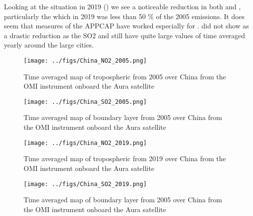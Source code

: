 Looking at the situation in 2019 () 
we see a noticeable reduction in both  and , particularly the  which 
in 2019 was less than 50 \% of the 2005 emissions. It does seem that measures of the APPCAP 
have worked especially for .  did not show as a drastic reduction as the \ch
{SO2} and still have quite large values of time averaged yearly  around the large cities. 
\begin{figure}[htpb]
    \centering
    \texttt{[image: ../figs/China\_NO2\_2005.png]}
    \caption{Time averaged map of tropospheric  from 2005 over China
    from the OMI instrument onboard the Aura satellite}
    \label{fig:OMI_ChinaNO2}
\end{figure}


\begin{figure}[htpb]
    \centering
    \texttt{[image: ../figs/China\_SO2\_2005.png]}
    \caption{Time averaged map of boundary layer from 2005 over China
    from the OMI instrument onboard the Aura satellite}
    \label{fig:OMI_China2005_SO2}
\end{figure}

\begin{figure}[htpb]
    \centering
        \texttt{[image: ../figs/China\_NO2\_2019.png]}
    \caption{Time averaged map of tropospheric  from 2019 
    over China from the OMI instrument  
    onboard the Aura satellite}
    \label{fig:OMI_China_2019NO2}
\end{figure}


\begin{figure}[htpb]
    \centering
    \texttt{[image: ../figs/China\_SO2\_2019.png]}
    \caption{Time averaged map of boundary layer from 2005 over China
    from the OMI instrument onboard the Aura satellite}
    \label{fig:OMI_China2019_SO2}
\end{figure}

